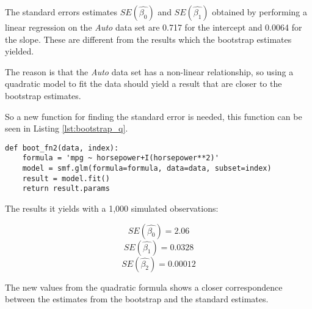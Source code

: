 The standard errors estimates $SE(\hat{\beta_0})$ and $SE(\hat{\beta_1})$ obtained by performing a linear regression on the \emph{Auto} data set are 0.717 for the intercept and 0.0064 for the slope. These are different from the results which the bootstrap estimates yielded.

The reason is that the \emph{Auto} data set has a non-linear relationship, so using a quadratic model to fit the data should yield a result that are closer to the bootstrap estimates.

So a new function for finding the standard error is needed, this function can be seen in Listing \ref{lst:bootstrap_q}.

\begin{lstlisting}[caption={Function to calculate standard error with a qudratic model}, label=lst:bootstrap_q, mathescape=true]
def boot_fn2(data, index):
	formula = 'mpg ~ horsepower+I(horsepower**2)'
	model = smf.glm(formula=formula, data=data, subset=index)
	result = model.fit()
	return result.params
\end{lstlisting}

The results it yields with a 1,000 simulated observations:

\begin{equation}
SE(\hat{\beta_0}) = 2.06
\end{equation}
\begin{equation}
SE(\hat{\beta_1}) = 0.0328
\end{equation}
\begin{equation}
SE(\hat{\beta_2}) = 0.00012
\end{equation}

The new values from the quadratic formula shows a closer correspondence between the estimates from the bootstrap and the standard estimates.